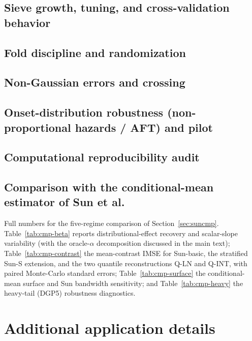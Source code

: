 \documentclass[11pt]{article}
\theoremstyle{remark}\newtheorem{remark}{Remark}
\begin{document}
\subsection{Sieve growth, tuning, and cross-validation behavior}







\subsection{Fold discipline and randomization}



\subsection{Non-Gaussian errors and crossing}




\subsection{Onset-distribution robustness (non-proportional hazards / AFT) and pilot}



\subsection{Computational reproducibility audit}


\subsection{Comparison with the conditional-mean estimator of Sun et al.}
\label{supp:sun}
Full numbers for the five-regime comparison of Section~\ref{sec:suncmp}.
Table~\ref{tab:cmp-beta} reports distributional-effect recovery and scalar-slope
variability (with the oracle-$\alpha$ decomposition discussed in the main text);
Table~\ref{tab:cmp-contrast} the mean-contrast IMSE for Sun-basic, the stratified
Sun-S extension, and the two quantile reconstructions Q-LN and Q-INT, with paired
Monte-Carlo standard errors; Table~\ref{tab:cmp-surface} the conditional-mean
surface and Sun bandwidth sensitivity; and Table~\ref{tab:cmp-heavy} the
heavy-tail (DGP5) robustness diagnostics.


\section{Additional application details}\label{supp:app}
\end{document}
